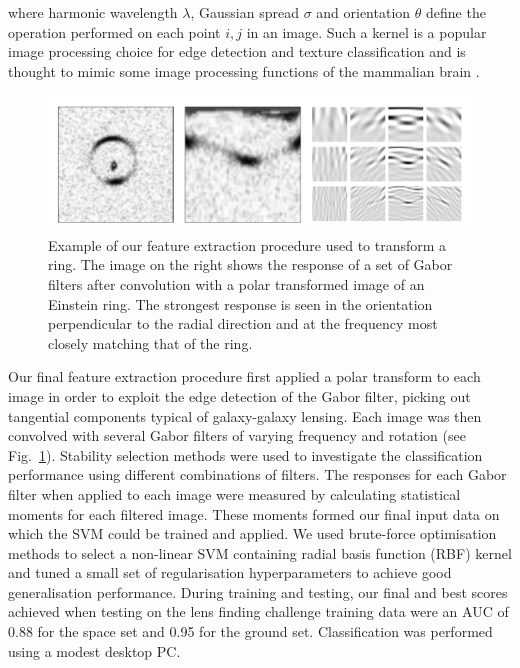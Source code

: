 \documentclass[useAMS,usenatbib]{mnras}
\begin{document}
where harmonic wavelength $\lambda$, Gaussian spread  $\sigma$ and orientation $\theta$ define the operation performed on each point $i,j$ in an image. Such a kernel is a popular image processing choice for edge detection and texture classification \citep[e.g.][]{Feichtinger98a,Springer-verlag97computationalmodels} and is thought to mimic some image processing functions of the mammalian brain \citep{Jones1233}.


\begin{figure}
  \centering
      \includegraphics[width=1\columnwidth]{figures/polarfilter.pdf} 
  \caption{Example of our feature extraction procedure used to transform a ring. The image on the right shows the response of a set of Gabor filters after convolution with a polar transformed image of an Einstein ring. The strongest response is seen in the orientation perpendicular to the radial direction and at the frequency most closely matching that of the ring.}
 \label{gaborring}
\end{figure}

Our final feature extraction procedure first applied a polar transform to each image in order to exploit the edge detection of the Gabor filter, picking out tangential components typical of galaxy-galaxy lensing. Each image was then convolved with several Gabor filters of varying frequency and rotation (see Fig.~\ref{gaborring}). Stability selection methods were used to investigate the classification performance using different combinations of filters. The responses for each Gabor filter when applied to each image were measured by calculating statistical moments for each filtered image. These moments formed  our final input data on which the SVM could be trained and applied. We used brute-force optimisation methods to select a non-linear SVM containing radial basis function (RBF) kernel and tuned a small set of regularisation hyperparameters to achieve good generalisation performance. During training and testing, our final and best scores achieved when testing on the lens finding challenge training data were an AUC of 0.88 for the space set and 0.95 for the ground set. Classification was performed using a modest desktop PC.
\end{document}
